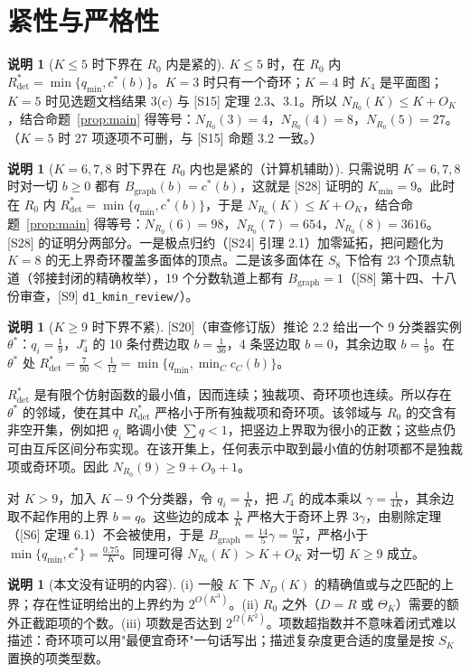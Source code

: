 \documentclass[11pt,a4paper]{article}
\theoremstyle{definition}
\newtheorem{remark}[theorem]{说明}
\newcommand{\Rdet}{R^*_{\mathrm{det}}}
\newcommand{\Bg}{B_{\mathrm{graph}}}
\begin{document}
\section{紧性与严格性}

\begin{remark}[$K\le5$ 时下界在 $R_0$ 内是紧的]
$K\le5$ 时，在 $R_0$ 内 $\Rdet=\min\{q_{\min},c^*(b)\}$。$K=3$ 时只有一个奇环；$K=4$ 时 $K_4$ 是平面图；$K=5$ 时见选题文档结果 3(c) 与 [S15] 定理 2.3、3.1。所以 $N_{R_0}(K)\le K+O_K$，结合命题~\ref{prop:main} 得等号：$N_{R_0}(3)=4$，$N_{R_0}(4)=8$，$N_{R_0}(5)=27$。（$K=5$ 时 27 项逐项不可删，与 [S15] 命题 3.2 一致。）
\end{remark}

\begin{remark}[$K=6,7,8$ 时下界在 $R_0$ 内也是紧的（计算机辅助）]
只需说明 $K=6,7,8$ 时对一切 $b\ge0$ 都有 $\Bg(b)=c^*(b)$，这就是 [S28] 证明的 $K_{\min}=9$。此时在 $R_0$ 内 $\Rdet=\min\{q_{\min},c^*(b)\}$，于是 $N_{R_0}(K)\le K+O_K$，结合命题~\ref{prop:main} 得等号：$N_{R_0}(6)=98$，$N_{R_0}(7)=654$，$N_{R_0}(8)=3616$。
[S28] 的证明分两部分。一是极点归约（[S24] 引理 2.1）加零延拓，把问题化为 $K=8$ 的无上界奇环覆盖多面体的顶点。二是该多面体在 $S_8$ 下恰有 23 个顶点轨道（邻接封闭的精确枚举），19 个分数轨道上都有 $\Bg=1$（[S8] 第十四、十八份审查，[S9] \texttt{d1\_kmin\_review/}）。
\end{remark}

\begin{remark}[$K\ge9$ 时下界不紧]
[S20]（审查修订版）推论 2.2 给出一个 9 分类器实例 $\theta^*$：$q_i=\tfrac19$，$J_4^\circ$ 的 10 条付费边取 $b=\tfrac1{36}$，4 条竖边取 $b=0$，其余边取 $b=\tfrac19$。在 $\theta^*$ 处 $\Rdet=\tfrac7{90}<\tfrac1{12}=\min\{q_{\min},\min_Cc_C(b)\}$。

$\Rdet$ 是有限个仿射函数的最小值，因而连续；独裁项、奇环项也连续。所以存在 $\theta^*$ 的邻域，使在其中 $\Rdet$ 严格小于所有独裁项和奇环项。该邻域与 $R_0$ 的交含有非空开集，例如把 $q_i$ 略调小使 $\sum q<1$，把竖边上界取为很小的正数；这些点仍可由互斥区间分布实现。在该开集上，任何表示中取到最小值的仿射项都不是独裁项或奇环项。因此 $N_{R_0}(9)\ge9+O_9+1$。

对 $K>9$，加入 $K-9$ 个分类器，令 $q_i=\tfrac1K$，把 $J_4^\circ$ 的成本乘以 $\gamma=\tfrac1{4K}$，其余边取不起作用的上界 $b=q$。这些边的成本 $\tfrac1K$ 严格大于奇环上界 $3\gamma$，由剔除定理（[S6] 定理 6.1）不会被使用，于是 $\Bg=\tfrac{14}{5}\gamma=\tfrac{0.7}K$，严格小于 $\min\{q_{\min},c^*\}=\tfrac{0.75}K$。同理可得 $N_{R_0}(K)>K+O_K$ 对一切 $K\ge9$ 成立。
\end{remark}

\begin{remark}[本文没有证明的内容]
(i) 一般 $K$ 下 $N_D(K)$ 的精确值或与之匹配的上界；存在性证明给出的上界约为 $2^{O(K^3)}$。(ii) $R_0$ 之外（$D=R$ 或 $\Theta_K$）需要的额外正截距项的个数。(iii) 项数是否达到 $2^{\Omega(K^2)}$。项数超指数并不意味着闭式难以描述：奇环项可以用"最便宜奇环"一句话写出；描述复杂度更合适的度量是按 $S_K$ 置换的项类型数。
\end{remark}
\end{document}
